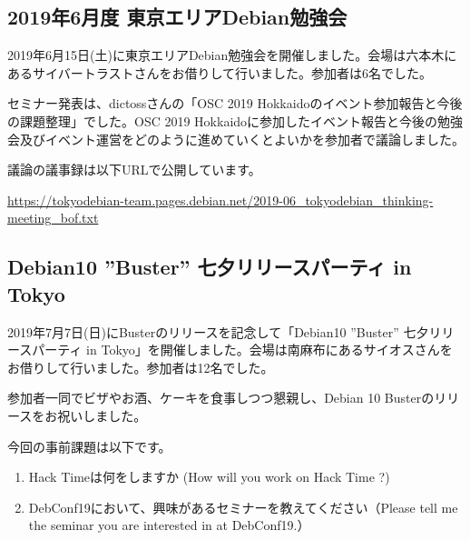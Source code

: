 \documentclass[mingoth,a4paper]{jsarticle}
\begin{document}

\subsection{2019年6月度 東京エリアDebian勉強会}

2019年6月15日(土)に東京エリアDebian勉強会を開催しました。会場は六本木にあるサイバートラストさんをお借りして行いました。参加者は6名でした。

セミナー発表は、dictossさんの「OSC 2019 Hokkaidoのイベント参加報告と今後の課題整理」でした。OSC 2019 Hokkaidoに参加したイベント報告と今後の勉強会及びイベント運営をどのように進めていくとよいかを参加者で議論しました。

議論の議事録は以下URLで公開しています。

\url{https://tokyodebian-team.pages.debian.net/2019-06_tokyodebian_thinking-meeting_bof.txt}


\subsection{Debian10 ''Buster'' 七夕リリースパーティ in Tokyo}

2019年7月7日(日)にBusterのリリースを記念して「Debian10 ''Buster'' 七夕リリースパーティ in Tokyo」を開催しました。会場は南麻布にあるサイオスさんをお借りして行いました。参加者は12名でした。

参加者一同でビザやお酒、ケーキを食事しつつ懇親し、Debian 10 Busterのリリースをお祝いしました。



今回の事前課題は以下です。

\begin{enumerate}
\item Hack Timeは何をしますか (How will you work on Hack Time ?)
\item DebConf19において、興味があるセミナーを教えてください（Please tell me the seminar you are interested in at DebConf19.）
\end{enumerate}


\begin{multicols}{2}
{\small

}
\end{multicols}

%
%
%
%
\end{document}
